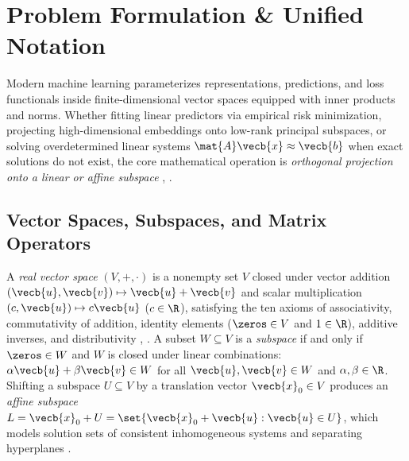 \documentclass[../../../../master.tex]{subfiles}
\begin{document}

\section{Problem Formulation \& Unified Notation}
\label{sec:vecnorm:formulation}

Modern machine learning parameterizes representations, predictions, and loss functionals inside finite-dimensional vector spaces equipped with inner products and norms. Whether fitting linear predictors via empirical risk minimization, projecting high-dimensional embeddings onto low-rank principal subspaces, or solving overdetermined linear systems $\mat{A}\vecb{x} \approx \vecb{b}$ when exact solutions do not exist, the core mathematical operation is \emph{orthogonal projection onto a linear or affine subspace} , .

\subsection{Vector Spaces, Subspaces, and Matrix Operators}

A \emph{real vector space} $(V, +, \cdot)$ is a nonempty set $V$ closed under vector addition $(\vecb{u}, \vecb{v}) \mapsto \vecb{u} + \vecb{v}$ and scalar multiplication $(c, \vecb{u}) \mapsto c\vecb{u}$ ($c \in \R$), satisfying the ten axioms of associativity, commutativity of addition, identity elements ($\zeros \in V$ and $1 \in \R$), additive inverses, and distributivity , . A subset $W \subseteq V$ is a \emph{subspace} if and only if $\zeros \in W$ and $W$ is closed under linear combinations: $\alpha\vecb{u} + \beta\vecb{v} \in W$ for all $\vecb{u}, \vecb{v} \in W$ and $\alpha, \beta \in \R$. Shifting a subspace $U \subseteq V$ by a translation vector $\vecb{x}_0 \in V$ produces an \emph{affine subspace} $L = \vecb{x}_0 + U = \set{\vecb{x}_0 + \vecb{u} : \vecb{u} \in U}$, which models solution sets of consistent inhomogeneous systems and separating hyperplanes .
\end{document}
